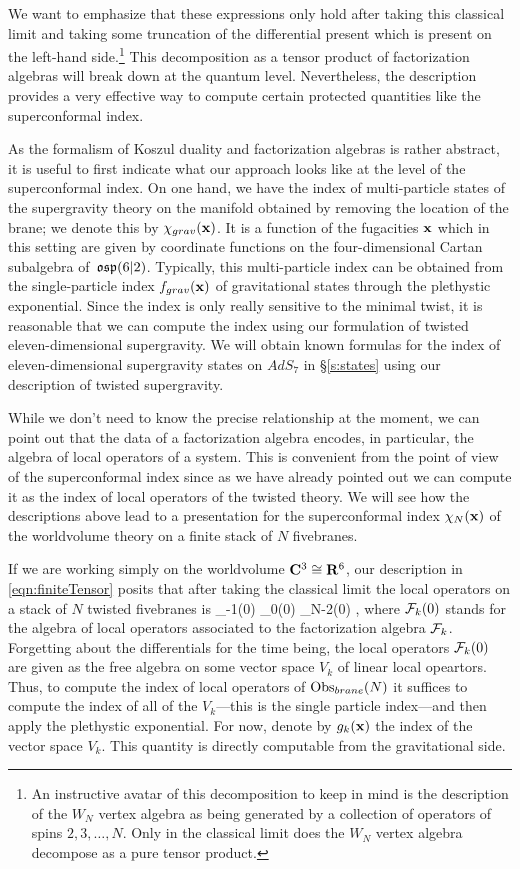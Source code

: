 \documentclass[11pt]{amsart}
\begin{document}
We want to emphasize that these expressions only hold after taking this classical limit and taking some truncation of the differential present which is present on the left-hand side.\footnote{An instructive avatar of this decomposition to keep in mind is the description of the $W_N$ vertex algebra as being generated by a collection of operators of spins $2,3,\ldots, N$.
Only in the classical limit does the $W_N$ vertex algebra decompose as a pure tensor product.}
This decomposition as a tensor product of factorization algebras will break down at the quantum level.
Nevertheless, the description provides a very effective way to compute certain protected quantities like the superconformal index.

As the formalism of Koszul duality and factorization algebras is rather abstract, it is useful to first indicate what our approach looks like at the level of the superconformal index. 
On one hand, we have the index of multi-particle states of the supergravity theory on the manifold obtained by removing the location of the brane; we denote this by $\chi_{grav}({\bf x})$.
It is a function of the fugacities ${\bf x}$ which in this setting are given by coordinate functions on the four-dimensional Cartan subalgebra of~$\mathfrak{osp}(6|2)$.
Typically, this multi-particle index can be obtained from the single-particle index $f_{grav}({\bf x})$ of gravitational states through the plethystic exponential. 
Since the index is only really sensitive to the minimal twist, it is reasonable that we can compute the index using our formulation of twisted eleven-dimensional supergravity.
We will obtain known formulas for the index of eleven-dimensional supergravity states on $AdS_7$ in \S\ref{s:states} using our description of twisted supergravity. 

While we don't need to know the precise relationship at the moment, we can point out that the data of a factorization algebra encodes, in particular, the algebra of local operators of a system.
This is convenient from the point of view of the superconformal index since as we have already pointed out we can compute it as the index of local operators of the twisted theory.
We will see how the descriptions above lead to a presentation for the superconformal index $\chi_N({\bf x})$ of the worldvolume theory on a finite stack of $N$ fivebranes. 

If we are working simply on the worldvolume $\mathbf{C}^3 \cong \mathbf{R}^6$, our description in \eqref{eqn:finiteTensor} posits that after taking the classical limit the local operators on a stack of $N$ twisted fivebranes is
\beqn
\cF_{-1}(0) \otimes \cF_0(0) \otimes \cdots \otimes \cF_{N-2}(0) ,
\eeqn
where $\mathcal F_k(0)$ stands for the algebra of local operators associated to the factorization algebra $\mathcal F_k$.
Forgetting about the differentials for the time being, the local operators $\mathcal F_k(0)$ are given as the free algebra on some vector space $V_k$ of linear local opeartors.
Thus, to compute the index of local operators of $\operatorname{Obs}_{brane}(N)$ it suffices to compute the index of all of the $V_k$---this is the single particle index---and then apply the plethystic exponential.
For now, denote by $g_k({\bf x})$ the index of the vector space $V_k$.
This quantity is directly computable from the gravitational side.
\end{document}
